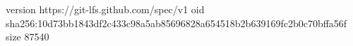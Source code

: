 version https://git-lfs.github.com/spec/v1
oid sha256:10d73bb1843df2c433c98a5ab85696828a654518b2b639169fc2b0c70bffa56f
size 87540
